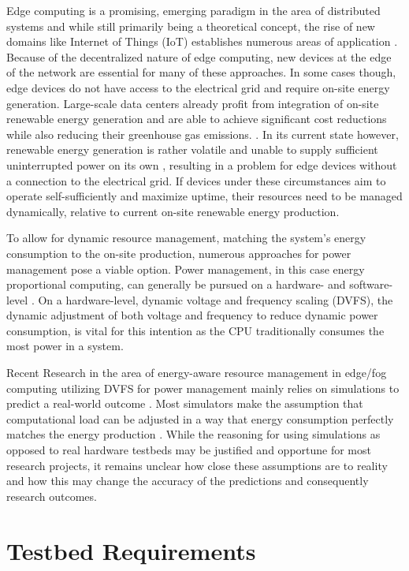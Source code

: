 Edge computing is a promising, emerging paradigm in the area of distributed
systems and while still primarily being a theoretical concept, the rise of new
domains like Internet of Things (IoT) establishes numerous areas of application
\cite{premsankar2018}. Because of the decentralized nature of edge computing,
new devices at the edge of the network are essential for many of these
approaches. In some cases though, edge devices do not have access to the
electrical grid and require on-site energy generation. %
Large-scale data centers already profit from integration of on-site renewable
energy generation and are able to achieve significant cost reductions while also
reducing their greenhouse gas emissions. \cite{tu2013}. In its current state
however, renewable energy generation is rather volatile and unable to supply
sufficient uninterrupted power on its own \cite{rostirolla2022}, resulting in a
problem for edge devices without a connection to the electrical grid. If devices
under these circumstances aim to operate self-sufficiently and maximize uptime,
their resources need to be managed dynamically, relative to current on-site
renewable energy production.

To allow for dynamic resource management, matching the system's energy
consumption to the on-site production, numerous approaches for power management
pose a viable option. Power management, in this case energy proportional
computing, can generally be pursued on a hardware- and software-level
\cite{barroso2007}. On a hardware-level, dynamic voltage and frequency scaling
(DVFS), the dynamic adjustment of both voltage and frequency to reduce dynamic
power consumption, is vital for this intention as the \textsc{CPU} traditionally
consumes the most power in a system.

Recent Research in the area of energy-aware resource management in edge/fog
computing utilizing DVFS for power management mainly relies on simulations to
predict a real-world outcome \cite{wiesner2022, karimiafshar2020, toor2019}.
Most simulators make the assumption that computational load can be adjusted in a
way that energy consumption perfectly matches the energy production \cite{leaf,
cloudsim, ifogsim, chameleon}. While the reasoning for using simulations as
opposed to real hardware testbeds may be justified and opportune for most
research projects, it remains unclear how close these assumptions are to reality
and how this may change the accuracy of the predictions and consequently
research outcomes.

\section{Testbed Requirements}

